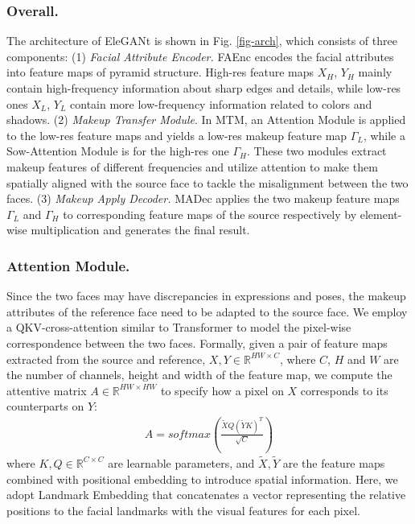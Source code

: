 \subsubsection{Overall.}
The architecture of EleGANt is shown in Fig. \ref{fig-arch}, which consists of three components: (1) \textit{Facial Attribute Encoder.} FAEnc encodes the facial attributes into feature maps of pyramid structure. High-res feature maps $X_H$, $Y_H$ mainly contain high-frequency information about sharp edges and details, while low-res ones $X_L$, $Y_L$ contain more low-frequency information related to colors and shadows. (2) \textit{Makeup Transfer Module}. In MTM, an Attention Module is applied to the low-res feature maps and yields a low-res makeup feature map $\Gamma_L$, while a Sow-Attention Module is for the high-res one $\Gamma_H$. These two modules extract makeup features of different frequencies and utilize attention to make them spatially aligned with the source face to tackle the misalignment between the two faces. (3) \textit{Makeup Apply Decoder.} MADec applies the two makeup feature maps $\Gamma_L$ and $\Gamma_H$ to corresponding feature maps of the source respectively by element-wise multiplication and generates the final result. 

\subsubsection{Attention Module.} 
Since the two faces may have discrepancies in expressions and poses, the makeup attributes of the reference face need to be adapted to the source face. We employ a QKV-cross-attention similar to Transformer \cite{Transformer} to model the pixel-wise correspondence between the two faces. Formally, given a pair of feature maps extracted from the source and reference, $X,Y\in \mathbb{R}^{HW\times C}$, where $C$, $H$ and $W$ are the number of channels, height and width of the feature map, we compute the attentive matrix $A\in \mathbb{R}^{HW\times HW}$ to specify how a pixel on $X$ corresponds to its counterparts on $Y$:
\begin{equation}
\begin{aligned}
    A=softmax\left(\frac{\widetilde{X}Q(\widetilde{Y}K)^T}{\sqrt{C}}\right)
\end{aligned}
\end{equation}
where $K,Q\in\mathbb{R}^{C\times C}$ 
are learnable parameters, 
and $\widetilde{X},\widetilde{Y}$ are the feature maps combined with positional embedding to introduce spatial information. Here, we adopt Landmark Embedding \cite{FAT} that concatenates a vector representing the relative positions to the facial landmarks with the visual features for each pixel.

